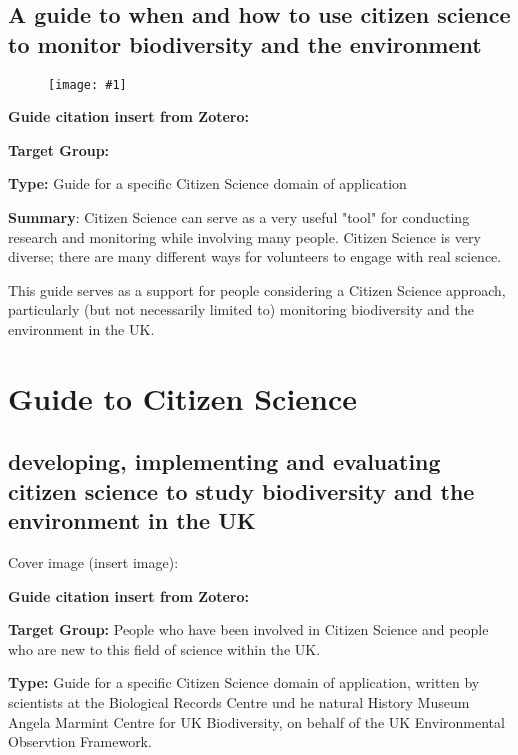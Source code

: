 \documentclass{article}
\newlength{\imgwidth}
\newcommand\scaledgraphics[2]{%
                
\settowidth{\imgwidth}{\texttt{[image: \#1]}}%
                
\setlength{\imgwidth}{\minof{\imgwidth}{#2\textwidth}}%
                
\texttt{[image: \#1]}%
                
}
\begin{document}
\subsection{A guide to when and how to use citizen science to monitor biodiversity and the environment}\label{H8816796}


\begin{figure}
\scaledgraphics{dba5d5eb-235c-4694-a2d4-c26b6e16182b.png}{0.5}
\label{F60064251}
\end{figure}


\textbf{Guide citation insert from Zotero:} \autocite{pocock_choosing_2014}


\textbf{Target Group:}


\textbf{Type: }Guide for a specific Citizen Science domain of application


\textbf{Summary}: Citizen Science can serve as a very useful "tool" for conducting research and monitoring while involving many people. Citizen Science is very diverse; there are many different ways for volunteers to engage with real science.


This guide serves as a support for people considering a Citizen Science approach, particularly (but not necessarily limited to) monitoring biodiversity and the environment in the UK.


\section{Guide to Citizen Science}\label{H3514415}



\subsection{developing, implementing and evaluating citizen science to study biodiversity and the environment in the UK}\label{H903150}



Cover image (insert image):


\textbf{Guide citation insert from Zotero:} \autocite{tweddle_guide_2012}


\textbf{Target Group: }People who have been involved in Citizen Science and people who are new to this field of science within the UK.


\textbf{Type: }Guide for a specific Citizen Science domain of application, written by scientists at the Biological Records Centre und he natural History Museum Angela Marmint Centre for UK Biodiversity, on behalf of the UK Environmental Observtion Framework.
\end{document}
